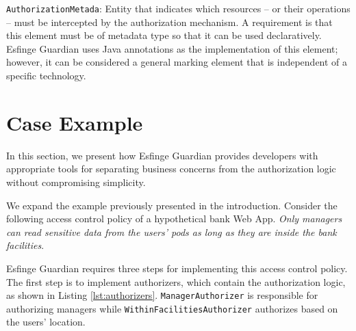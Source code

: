 \documentclass[sigconf]{acmart}
\begin{document}
\noindent \verb|AuthorizationMetada|: Entity that indicates which resources – or their operations – must be intercepted by the authorization mechanism. A requirement is that this element must be of metadata type so that it can be used declaratively. Esfinge Guardian uses Java annotations as the implementation of this element; however, it can be considered a general marking element that is independent of a specific technology.


\section{Case Example}

In this section, we present how Esfinge Guardian provides developers with appropriate tools for separating business concerns from the authorization logic without compromising simplicity.

We expand the example previously presented in the introduction. Consider the following access control policy of a hypothetical bank Web App. \textit{Only managers can read sensitive data from the users' pods as long as they are inside the bank facilities}.

Esfinge Guardian requires three steps for implementing this access control policy. The first step is to implement authorizers, which contain the authorization logic, as shown in Listing \ref{lst:authorizers}. \verb|ManagerAuthorizer| is responsible for authorizing managers while \verb|WithinFacilitiesAuthorizer| authorizes based on the users' location.
\end{document}
